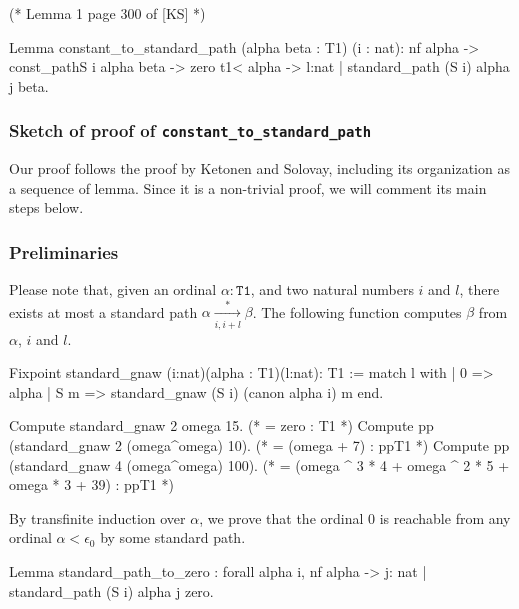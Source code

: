 \begin{Coqsrc}
(* Lemma 1 page 300 of [KS] *)

Lemma constant_to_standard_path 
  (alpha beta : T1) (i : nat):
  nf alpha -> const_pathS i alpha beta -> zero  t1< alpha ->
  {l:nat | standard_path (S i) alpha j beta}.
\end{Coqsrc}

 

\subsubsection{Sketch of proof of \texttt{constant\_to\_standard\_path}}

Our proof follows the proof by Ketonen and Solovay, including its organization as a sequence of lemma.  Since it is a non-trivial proof, we will comment its main steps below.

\subsubsection*{Preliminaries}


Please note that, given an ordinal $\alpha:\texttt{T1}$, and two natural numbers $i$ and $l$, there exists at most a standard path $\alpha \xrightarrow [i,i+l]{*} \beta$.
The following function computes $\beta$ from $\alpha$, $i$ and $l$.

\begin{Coqsrc}
Fixpoint standard_gnaw (i:nat)(alpha : T1)(l:nat):  T1  :=
  match l with
  | 0 => alpha
  | S m => standard_gnaw (S i) (canon alpha i) m
  end.
\end{Coqsrc}

\begin{Coqsrc}
  Compute standard_gnaw 2 omega 15.
(*   = zero
     : T1 *)
Compute pp (standard_gnaw 2 (omega^omega)  10).
(*
= (omega + 7)%
     : ppT1
*)
Compute pp (standard_gnaw 4 (omega^omega)  100).
(*
 = (omega ^ 3 * 4 + omega ^ 2 * 5 + omega * 3 + 39)%
     : ppT1 *)
\end{Coqsrc}


By transfinite induction over  $\alpha$, we prove that the ordinal $0$ is reachable from any ordinal $\alpha<\epsilon_0$ by some standard path.


\begin{Coqsrc}
Lemma standard_path_to_zero :
  forall  alpha i, nf alpha ->
                   {j: nat | standard_path (S i) alpha j zero}.
\end{Coqsrc}

